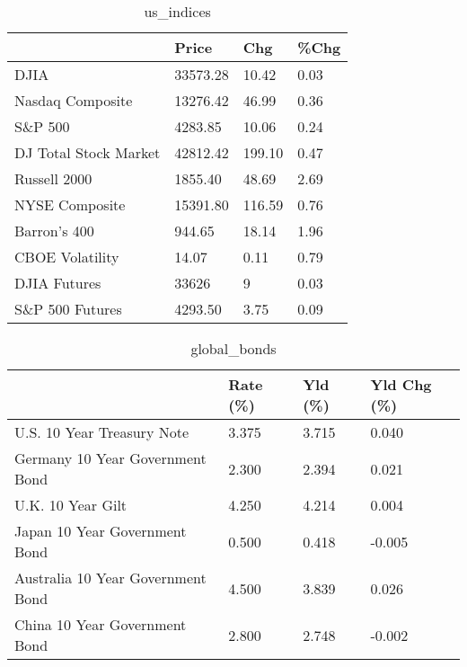 \documentclass{article}%
\begin{document}
%


\begin{table}[htbp]%
\caption{us\_indices}%
\centering%
\begin{adjustbox}{width=1\textwidth}%
\begin{tabular}{llll}
\toprule
                      &    Price &    Chg & \%Chg \\
\midrule
                 DJIA & 33573.28 &  10.42 & 0.03 \\
     Nasdaq Composite & 13276.42 &  46.99 & 0.36 \\
              S\&P 500 &  4283.85 &  10.06 & 0.24 \\
DJ Total Stock Market & 42812.42 & 199.10 & 0.47 \\
         Russell 2000 &  1855.40 &  48.69 & 2.69 \\
       NYSE Composite & 15391.80 & 116.59 & 0.76 \\
         Barron's 400 &   944.65 &  18.14 & 1.96 \\
      CBOE Volatility &    14.07 &   0.11 & 0.79 \\
         DJIA Futures &    33626 &      9 & 0.03 \\
      S\&P 500 Futures &  4293.50 &   3.75 & 0.09 \\
\bottomrule
\end{tabular}
%
\end{adjustbox}%
\end{table}

%


\begin{table}[htbp]%
\caption{global\_bonds}%
\centering%
\begin{adjustbox}{width=1\textwidth}%
\begin{tabular}{llll}
\toprule
                                  & Rate (\%) & Yld (\%) & Yld Chg (\%) \\
\midrule
       U.S. 10 Year Treasury Note &    3.375 &   3.715 &       0.040 \\
  Germany 10 Year Government Bond &    2.300 &   2.394 &       0.021 \\
                U.K. 10 Year Gilt &    4.250 &   4.214 &       0.004 \\
    Japan 10 Year Government Bond &    0.500 &   0.418 &      -0.005 \\
Australia 10 Year Government Bond &    4.500 &   3.839 &       0.026 \\
    China 10 Year Government Bond &    2.800 &   2.748 &      -0.002 \\
\bottomrule
\end{tabular}
%
\end{adjustbox}%
\end{table}
\end{document}
